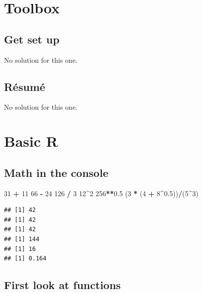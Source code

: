 \documentclass[]{book}
\newenvironment{Shaded}{\begin{snugshade}}{\end{snugshade}}
\newcommand{\DecValTok}[1]{\textcolor[rgb]{0.00,0.00,0.81}{#1}}
\newcommand{\FloatTok}[1]{\textcolor[rgb]{0.00,0.00,0.81}{#1}}
\newcommand{\NormalTok}[1]{#1}
\newcommand{\OperatorTok}[1]{\textcolor[rgb]{0.81,0.36,0.00}{\textbf{#1}}}
\newcommand{\StringTok}[1]{\textcolor[rgb]{0.31,0.60,0.02}{#1}}
\begin{document}
\hypertarget{toolbox-2}{%
\section{Toolbox}\label{toolbox-2}}

\hypertarget{get-set-up-1}{%
\subsection{Get set up}\label{get-set-up-1}}

No solution for this one.

\hypertarget{resume-1}{%
\subsection{Résumé}\label{resume-1}}

No solution for this one.

\hypertarget{basic-r-1}{%
\section{Basic R}\label{basic-r-1}}

\hypertarget{math-in-the-console-1}{%
\subsection{Math in the console}\label{math-in-the-console-1}}

\begin{Shaded}
\begin{Highlighting}[]
\DecValTok{31} \OperatorTok{+}\StringTok{ }\DecValTok{11}
\DecValTok{66} \OperatorTok{-}\StringTok{ }\DecValTok{24}
\DecValTok{126} \OperatorTok{/}\StringTok{ }\DecValTok{3}
\DecValTok{12}\OperatorTok{^}\DecValTok{2} 
\DecValTok{256}\OperatorTok{**}\FloatTok{0.5}
\NormalTok{(}\DecValTok{3} \OperatorTok{*}\StringTok{ }\NormalTok{(}\DecValTok{4} \OperatorTok{+}\StringTok{ }\DecValTok{8}\OperatorTok{^}\FloatTok{0.5}\NormalTok{))}\OperatorTok{/}\NormalTok{(}\DecValTok{5}\OperatorTok{^}\DecValTok{3}\NormalTok{)}
\end{Highlighting}
\end{Shaded}

\begin{verbatim}
## [1] 42
## [1] 42
## [1] 42
## [1] 144
## [1] 16
## [1] 0.164
\end{verbatim}

\hypertarget{first-look-at-functions-1}{%
\subsection{First look at functions}\label{first-look-at-functions-1}}
\end{document}
